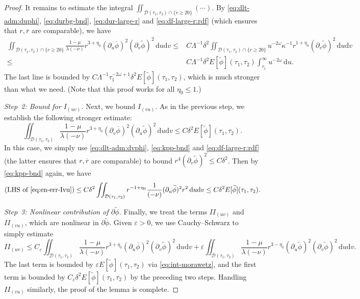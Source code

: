 \documentclass[10pt, reqno]{amsart}
\theoremstyle{definition}
\theoremstyle{remark}
\theoremstyle{conjecture}
\numberwithin{equation}{section}
\newcommand{\set}[1]{\{#1\}}
\newcommand{\ud}{\mathrm{d}}
\newcommand{\rd}{\partial}
\newcommand{\0}{\emptyset}
\newcommand{\dlt}{\delta}
\newcommand{\veps}{\varepsilon}
\newcommand{\kpp}{\kappa}
\newcommand{\lmb}{\lambda}
\newcommand{\Lmb}{\Lambda}
\newcommand{\omg}{\omega}
\newcommand{\calD}{\mathcal D}
\newcommand{\dur}{\nu}
\newcommand{\dvr}{\lmb}
\newcommand{\f}{\frac}
\newcommand{\pfstep}[1]{\vspace{.5em} {\it \noindent #1.}}
\newcommand{\phibg}{\overline{\phi}}				%
\newcommand{\rbg}{\overline{r}}					%
\newcommand{\phidf}{\widetilde{\phi}}				%
\begin{document}
\begin{proof}
It remains to estimate the integral $\iint_{\calD(\tau_{1}, \tau_{2}) \cap \set{r \geq 20}} (\cdots)$. By \eqref{eq:dlt-adm:duphi}, \eqref{eq:durbg-bnd}, \eqref{eq:dur-large-r} and \eqref{eq:df-large-r:rdf} (which ensures that $r, \rbg$ are comparable), we have
\begin{align*}
	\iint_{\calD(\tau_{1}, \tau_{2}) \cap \set{r \geq 20}} \frac{1-\mu}{\dvr(-\dur)} r^{3+\eta_{0}} (\rd_{u} \phibg)^{2}  (\rd_{v} \phidf)^{2} \, \ud u \ud v
	\leq & C \Lmb^{-1} \dlt^{2} \iint_{\calD(\tau_{1}, \tau_{2}) \cap \set{r \geq 20}} u^{-2 \omg} \kpp^{-1} r^{1+\eta_{0}} (\rd_{v} \phidf)^{2} \, \ud u \ud v \\
	\leq & C \Lmb^{-1} \dlt^{2} E[\phidf](\tau_{1}, \tau_{2}) \int_{\tau_{1}}^{\infty} u^{-2 \omg} \, \ud u.
\end{align*}
The last line is bounded by $C \Lmb^{-1} \tau_{1}^{-2\omg+1} \dlt^{2} E[\phidf](\tau_{1}, \tau_{2}) $, which is much stronger than what we need. (Note that this proof works for all $\eta_{0} \leq 1$.)

\pfstep{Step~2: Bound for $I_{(uv)}$}
Next, we bound $I_{(vu)}$. As in the previous step, we establish the following stronger estimate:
\begin{equation} \label{eq:en-err-Ivu} 
	\iint_{\calD(\tau_{1}, \tau_{2})} \frac{1-\mu}{\dvr(-\dur)} r^{3+\eta_{0}} (\rd_{v} \phibg)^{2}  (\rd_{u} \phidf)^{2} \, \ud u \ud v
	\leq C \dlt^{2} E[\phidf](\tau_{1}, \tau_{2}).
\end{equation}
In this case, we simply use \eqref{eq:dlt-adm:dvphi}, \eqref{eq:kpp-bnd} and \eqref{eq:df-large-r:rdf} (the latter ensures that $r, \rbg$ are comparable) to bound $r^{4} (\rd_{v} \phidf)^{2} \leq C \dlt^{2}$. Then by \eqref{eq:kpp-bnd} again, we have
\begin{equation*}
	(\hbox{LHS of \eqref{eq:en-err-Ivu}})
	\leq C \dlt^{2} \iint_{\calD(\tau_{1}, \tau_{2})} r^{-1+\eta_{0}} \f{1}{(-\nu)} (\rd_{u} \phidf)^{2} r^{2} \, \ud u \ud v
	\leq C \dlt^{2} E[\phidf](\tau_{1}, \tau_{2}).
\end{equation*}

\pfstep{Step~3: Nonlinear contribution of $\rd \phidf$}
Finally, we treat the terms $II_{(uv)}$ and $II_{(vu)}$, which are nonlinear in $\rd \phidf$. Given $\veps > 0$, we use Cauchy--Schwarz to simply estimate
\begin{equation*}
	II_{(uv)} 
	\leq C_{\veps} \iint_{\calD(\tau_{1}, \tau_{2})} \frac{1-\mu}{\dvr (-\dur)} r^{3+\eta_{0}} (\rd_{u} \phibg)^{2} (\rd_{v} \phidf)^{2} \, \ud u \ud v 		+ \veps \iint_{\calD(\tau_{1}, \tau_{2})} \frac{1-\mu}{\dvr (-\dur)} r^{3-\eta_{0}} (\rd_{u} \phidf)^{2} (\rd_{v} \phidf)^{2} \, \ud u \ud v .
\end{equation*}
The last term is bounded by $\veps E[\phidf](\tau_{1}, \tau_{2})$ via \eqref{eq:int-morawetz}, and the first term is bounded by $C_{\veps} \dlt^{2} E[\phidf](\tau_{1}, \tau_{2})$ by the preceding two steps. Handling $II_{(vu)}$ similarly, the proof of the lemma is complete. \qedhere
\end{proof}
\end{document}
